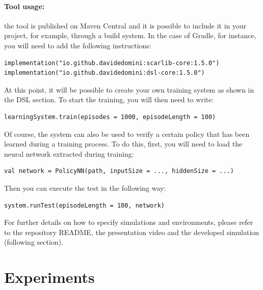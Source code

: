 \paragraph{Tool usage:}

the tool is published on Maven Central 
 and it is possible to include it in your project, 
 for example, through a build system. 
 In the case of Gradle, for instance, 
 you will need to add the following instructions:
\begin{lstlisting}
implementation("io.github.davidedomini:scarlib-core:1.5.0")
implementation("io.github.davidedomini:dsl-core:1.5.0")
\end{lstlisting}
%
At this point, it will be possible to create 
 your own training system as shown in the DSL section. 
 To start the training, you will then need to write:
\begin{lstlisting}
learningSystem.train(episodes = 1000, episodeLength = 100)
\end{lstlisting}
%
Of course, 
 the system can also be used to verify a certain 
 policy that has been learned during a training process. 
% 
To do this, first, 
 you will need to load the neural network extracted during training:
\begin{lstlisting}
val network = PolicyNN(path, inputSize = ..., hiddenSize = ...)
\end{lstlisting}
Then you can execute the test in the following way:
\begin{lstlisting}
system.runTest(episodeLength = 100, network)
\end{lstlisting}
For further details on how to specify simulations and environments, 
 please refer to the repository README, 
 the presentation video and 
 the developed simulation (following section).
\section{Experiments}\label{coordination2023:experiments}

